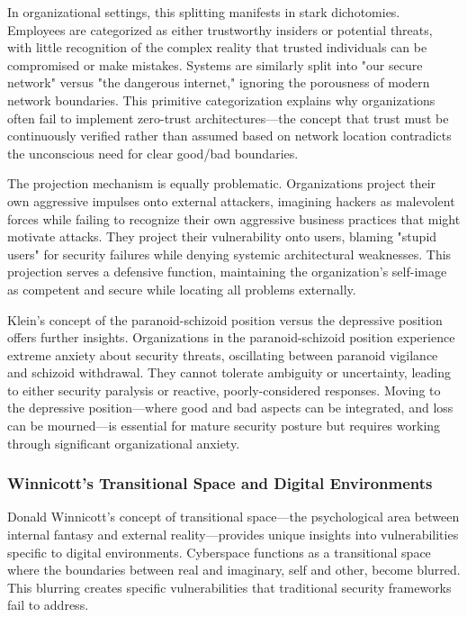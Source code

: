 \documentclass[11pt,a4paper]{article}
\begin{document}
In organizational settings, this splitting manifests in stark dichotomies. Employees are categorized as either trustworthy insiders or potential threats, with little recognition of the complex reality that trusted individuals can be compromised or make mistakes. Systems are similarly split into "our secure network" versus "the dangerous internet," ignoring the porousness of modern network boundaries. This primitive categorization explains why organizations often fail to implement zero-trust architectures—the concept that trust must be continuously verified rather than assumed based on network location contradicts the unconscious need for clear good/bad boundaries.

The projection mechanism is equally problematic. Organizations project their own aggressive impulses onto external attackers, imagining hackers as malevolent forces while failing to recognize their own aggressive business practices that might motivate attacks. They project their vulnerability onto users, blaming "stupid users" for security failures while denying systemic architectural weaknesses. This projection serves a defensive function, maintaining the organization's self-image as competent and secure while locating all problems externally.

Klein's concept of the paranoid-schizoid position versus the depressive position offers further insights. Organizations in the paranoid-schizoid position experience extreme anxiety about security threats, oscillating between paranoid vigilance and schizoid withdrawal. They cannot tolerate ambiguity or uncertainty, leading to either security paralysis or reactive, poorly-considered responses. Moving to the depressive position—where good and bad aspects can be integrated, and loss can be mourned—is essential for mature security posture but requires working through significant organizational anxiety.

\subsubsection{Winnicott's Transitional Space and Digital Environments}

Donald Winnicott's concept of transitional space\cite{winnicott1971}—the psychological area between internal fantasy and external reality—provides unique insights into vulnerabilities specific to digital environments. Cyberspace functions as a transitional space where the boundaries between real and imaginary, self and other, become blurred. This blurring creates specific vulnerabilities that traditional security frameworks fail to address.
\end{document}
